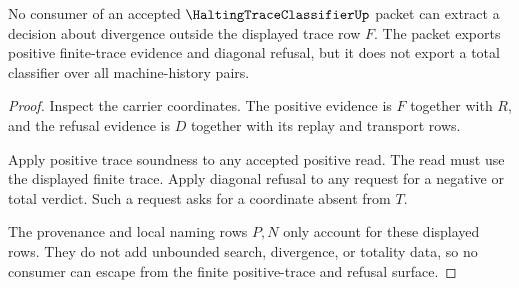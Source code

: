 \begin{theorem}
\label{thm:halting-trace-classifier-nonescape}
No consumer of an accepted $\HaltingTraceClassifierUp$ packet can extract a decision about divergence outside the displayed trace row $F$. The packet exports positive finite-trace evidence and diagonal refusal, but it does not export a total classifier over all machine-history pairs.
\end{theorem}
\begin{proof}
Inspect the carrier coordinates. The positive evidence is $F$ together with $R$, and the refusal evidence is $D$ together with its replay and transport rows.

Apply positive trace soundness to any accepted positive read. The read must use the displayed finite trace. Apply diagonal refusal to any request for a negative or total verdict. Such a request asks for a coordinate absent from $T$.

The provenance and local naming rows $P,N$ only account for these displayed rows. They do not add unbounded search, divergence, or totality data, so no consumer can escape from the finite positive-trace and refusal surface.
\end{proof}

